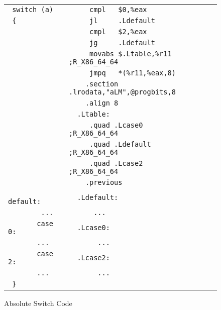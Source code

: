 \begin{figure}[H]
\Hrule
\caption{Absolute Switch Code}\label{large_abs_switch}
\begin{footnotesize}
\begin{tabular}{|l|l|}
\hline
\verb# switch (a)     # & \verb#     cmpl   $0,%eax           # \\
\verb# {              # & \verb#     jl     .Ldefault         # \\
\verb#                # & \verb#     cmpl   $2,%eax           # \\
\verb#                # & \verb#     jg     .Ldefault         # \\
\verb#                # & \verb#     movabs $.Ltable,%r11  ;R_X86_64_64 # \\
\verb#                # & \verb#     jmpq   *(%r11,%eax,8)    # \\
\verb#                # & \verb#    .section .lrodata,"aLM",@progbits,8 # \\
\verb#                # & \verb#    .align 8                  # \\ 
\verb#                # & \verb#  .Ltable:                    # \\
\verb#                # & \verb#     .quad .Lcase0          ;R_X86_64_64 # \\
\verb#                # & \verb#     .quad .Ldefault        ;R_X86_64_64 # \\
\verb#                # & \verb#     .quad .Lcase2          ;R_X86_64_64 # \\
\verb#                # & \verb#    .previous                 # \\
\verb#       default: # & \verb#  .Ldefault:                         # \\
\verb#        ...     # & \verb#      ...                            # \\
\verb#       case 0:  # & \verb#  .Lcase0:                           # \\
\verb#       ...      # & \verb#       ...                           # \\
\verb#       case 2:  # & \verb#  .Lcase2:                           # \\
\verb#       ...      # & \verb#       ...                           # \\
\verb# }              # & \verb#                                     # \\
\hline
\end{tabular}
\end{footnotesize}
\end{figure}

